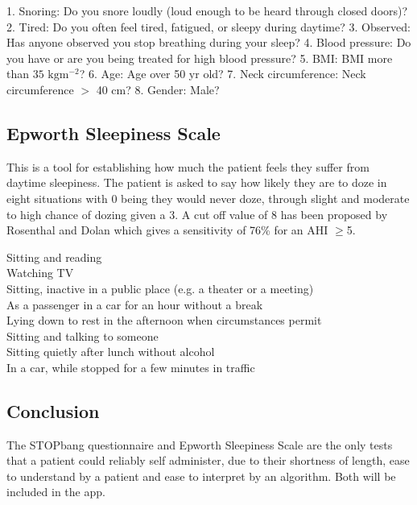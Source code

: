 1. Snoring: Do you snore loudly (loud enough to be heard through closed doors)?
2. Tired: Do you often feel tired, fatigued, or sleepy during daytime?
3. Observed: Has anyone observed you stop breathing during your sleep?
4. Blood pressure: Do you have or are you being treated for high blood pressure?
5. BMI: BMI more than $35 \text{ kg} \text{m}^{−2}$?
6. Age: Age over 50 yr old?
7. Neck circumference: Neck circumference $>$ 40 cm?
8. Gender: Male?

\subsection{Epworth Sleepiness Scale}
This is a tool for establishing how much the patient feels they suffer from daytime sleepiness. The patient is asked to say how likely they are to doze in eight situations with 0 being they would never doze, through slight and moderate to high chance of dozing given a 3. A cut off value of 8 has been proposed by Rosenthal and Dolan which gives a sensitivity of 76\% for an AHI $\geq$5. 

Sitting and reading\\
Watching TV\\
Sitting, inactive in a public place (e.g. a theater or a meeting)\\
As a passenger in a car for an hour without a break\\
Lying down to rest in the afternoon when circumstances permit\\
Sitting and talking to someone\\
Sitting quietly after lunch without alcohol\\
In a car, while stopped for a few minutes in traffic

\subsection{Conclusion}
The STOPbang questionnaire and Epworth Sleepiness Scale are the only tests that a patient could reliably self administer, due to their shortness of length, ease to understand by a patient and ease to interpret by an algorithm. Both will be included in the app.
